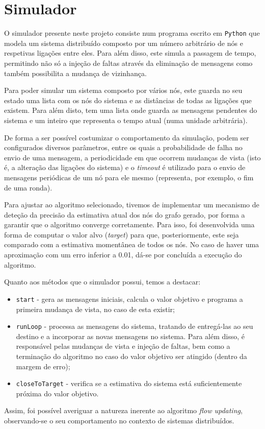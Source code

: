 \documentclass[a4paper]{report}
\begin{document}
{\let\clearpage\relax \chapter{Simulador} \label{ch:Simulator}}
\large{
	O simulador presente neste projeto consiste num programa escrito em \texttt{Python} que modela um sistema distribuído composto por um número arbitrário de nós e respetivas ligações entre eles.
	Para além disso, este simula a passagem de tempo, permitindo não só a injeção de faltas através da eliminação de mensagens como também possibilita a mudança de vizinhança.
	
	Para poder simular um sistema composto por vários nós, este guarda no seu estado uma lista com os nós do sistema e as distâncias de todas as ligações que existem. Para além disto, tem uma lista onde guarda as mensagens pendentes do sistema e um inteiro que representa o tempo atual (numa unidade arbitrária).
	
	De forma a ser possível costumizar o comportamento da simulação, podem ser configurados diversos parâmetros, entre os quais a probabilidade de falha no envio de uma mensagem, a periodicidade em que ocorrem mudanças de vista (isto é, a alteração das ligações do sistema) e o \textit{timeout} é utilizado para o envio de mensagens periódicas de um nó para ele mesmo (representa, por exemplo, o fim de uma ronda).
	
	Para ajustar ao algoritmo selecionado, tivemos de implementar um mecanismo de deteção da precisão da estimativa atual dos nós do grafo gerado, por forma a garantir que o algoritmo converge corretamente.
	Para isso, foi desenvolvida uma forma de computar o valor alvo (\textit{target}) para que, posteriormente, este seja comparado com a estimativa momentânea de todos os nós. No caso de haver uma aproximação com um erro inferior a 0.01, dá-se por concluída a execução do algoritmo.

	Quanto aos métodos que o simulador possui, temos a destacar:
	\begin{itemize}
		\item \texttt{start} - gera as mensagens iniciais, calcula o valor objetivo e programa a primeira mudança de vista, no caso de esta existir;
		\item \texttt{runLoop} - processa as mensagens do sistema, tratando de entregá-las ao seu destino e a incorporar as novas mensagens no sistema. Para além disso, é responsável pelas mudanças de vista e injeção de faltas, bem como a terminação do algoritmo no caso do valor objetivo ser atingido (dentro da margem de erro);
		\item \texttt{closeToTarget} - verifica se a estimativa do sistema está suficientemente próxima do valor objetivo.
	\end{itemize}

	Assim, foi possível averiguar a natureza inerente ao algoritmo \textit{flow updating}, observando-se o seu comportamento no contexto de sistemas distribuídos.
}
\end{document}

